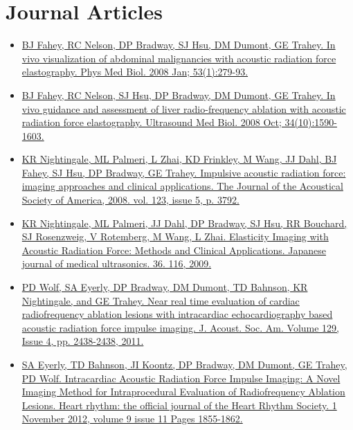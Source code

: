 \documentclass[letterpaper,10pt,english]{sphinxmanual}
\begin{document}
\section{Journal Articles}
\label{resume:journal-articles}\begin{itemize}
\item {} 
\href{http://www.ncbi.nlm.nih.gov/pmc/articles/PMC2238175/}{BJ Fahey, RC Nelson, DP Bradway, SJ Hsu, DM Dumont, GE Trahey. In
vivo visualization of abdominal malignancies with acoustic radiation
force elastography. Phys Med Biol. 2008 Jan;
53(1):279-93.}

\item {} 
\href{http://www.ncbi.nlm.nih.gov/pmc/articles/PMC2610689/}{BJ Fahey, RC Nelson, SJ Hsu, DP Bradway, DM Dumont, GE Trahey. In
vivo guidance and assessment of liver radio-frequency ablation with
acoustic radiation force elastography. Ultrasound Med Biol. 2008 Oct;
34(10):1590-1603.}

\item {} 
\href{http://dx.doi.org/10.1121/1.2935460}{KR Nightingale, ML Palmeri, L Zhai, KD Frinkley, M Wang, JJ Dahl, BJ
Fahey, SJ Hsu, DP Bradway, GE Trahey. Impulsive acoustic radiation
force: imaging approaches and clinical applications. The Journal of
the Acoustical Society of America, 2008. vol. 123, issue 5, p.
3792.}

\item {} 
\href{http://ci.nii.ac.jp/naid/10024927925/}{KR Nightingale, ML Palmeri, JJ Dahl, DP Bradway, SJ Hsu, RR
Bouchard, SJ Rosenzweig, V Rotemberg, M Wang, L Zhai. Elasticity
Imaging with Acoustic Radiation Force: Methods and Clinical
Applications. Japanese journal of medical ultrasonics. 36. 116,
2009.}

\item {} 
\href{http://dx.doi.org/10.1121/1.3587978}{PD Wolf, SA Eyerly, DP Bradway, DM Dumont, TD Bahnson, KR
Nightingale, and GE Trahey. Near real time evaluation of cardiac
radiofrequency ablation lesions with intracardiac echocardiography
based acoustic radiation force impulse imaging. J. Acoust. Soc. Am.
Volume 129, Issue 4, pp. 2438-2438,
2011.}

\item {} 
\href{http://dx.doi.org/10.1016\%2Fj.hrthm.2012.07.003}{SA Eyerly, TD Bahnson, JI Koontz, DP Bradway, DM Dumont, GE Trahey,
PD Wolf. Intracardiac Acoustic Radiation Force Impulse Imaging: A
Novel Imaging Method for Intraprocedural Evaluation of Radiofrequency
Ablation Lesions. Heart rhythm: the official journal of the Heart
Rhythm Society. 1 November 2012, volume 9 issue 11 Pages
1855-1862.}


\end{itemize}
\end{document}
